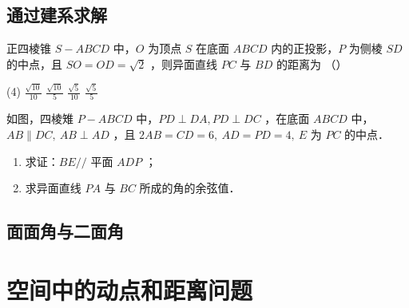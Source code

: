 \subsection{通过建系求解}

\begin{example}
    正四棱锥 $S-A B C D$ 中，$O$ 为顶点 $S$ 在底面 $A B C D$ 内的正投影，$P$ 为侧棱 $S D$ 的中点，且 $S O=O D=\sqrt{2}$ ，则异面直线 $P C$ 与 $B D$ 的距离为 （\qquad）
    \begin{tasks}(4)
        \task $\frac{\sqrt{10}}{10}$
        \task $\frac{\sqrt{10}}{5}$
        \task $\frac{\sqrt{5}}{10}$
        \task $\frac{\sqrt{5}}{5}$
    \end{tasks}
\end{example}

\begin{figure} [H]
    \resizebox{0.25\textwidth}{!}{}
\end{figure}

\begin{example}
    如图，四棱雉 $P-A B C D$ 中，$P D \perp D A, P D \perp D C$ ，在底面 $A B C D$ 中，$A B \| D C, ~ A B \perp A D$ ，且 $2 A B=C D=6, ~ A D=P D=4, ~ E$ 为 $P C$ 的中点．
    \begin{enumerate}
        \item 求证：$B E / /$ 平面 $A D P$ ；
        \item 求异面直线 $P A$ 与 $B C$ 所成的角的余弦值．
    \end{enumerate}
\end{example}

\begin{figure} [H]
    \resizebox{0.2\textwidth}{!}{}
\end{figure}

\subsection{面面角与二面角}

\begin{theorem}

\end{theorem}


\section{空间中的动点和距离问题}

